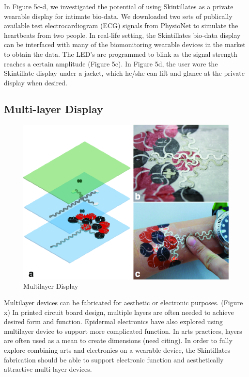 \documentclass{sigchi}
\begin{document}
In Figure 5c-d, we investigated the potential of using Skintillates as a private wearable display for intimate bio-data. We downloaded two sets of publically available test electrocardiogram (ECG) signals from PhysioNet to simulate the heartbeats from two people. In real-life setting, the Skintillates bio-data display can be interfaced with many of the biomonitoring wearable devices in the market to obtain the data. The LED’s are programmed to blink as the signal strength reaches a certain amplitude (Figure 5c). In Figure 5d, the user wore the Skintillate display under a jacket, which he/she can lift and glance at the private display when desired. 

\subsection{Multi-layer Display}
\begin{figure}[!h]
\centering
\includegraphics[width=1\columnwidth]{figures/Figure6}
\caption{Multilayer Display}
\label{fig:figure6}
\end{figure}
Multilayer devices can be fabricated for aesthetic or electronic purposes. (Figure x) In printed circuit board design, multiple layers are often needed to achieve desired form and function. Epidermal electronics have also explored using multilayer device to support more complicated function. In arts practices, layers are often used as a mean to create dimensions (need citing). In order to fully explore combining arts and electronics on a wearable device, the Skintillates fabrication should be able to support electronic function and aesthetically attractive multi-layer devices.  
\end{document}
